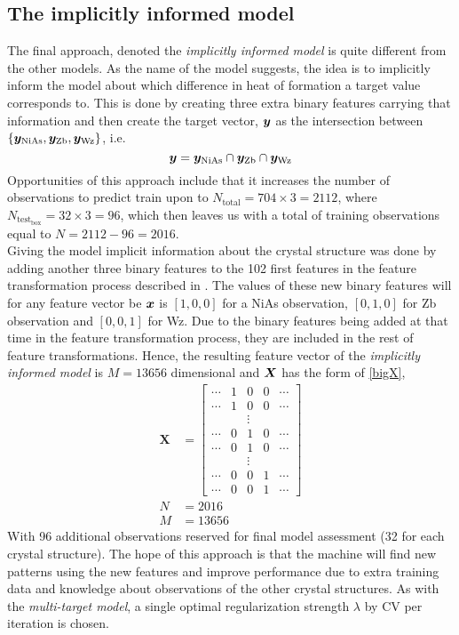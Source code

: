 \subsection{The implicitly informed model}
The final approach, denoted the \emph{implicitly informed model} is quite different from the other models. As the name of the model suggests, the idea is to implicitly inform the model about which difference in heat of formation a target value corresponds to. This is done by creating three extra binary features carrying that information and then create the target vector, $\bm{y}$ as the intersection between $\left\{\bm{y}_{\mathrm{NiAs}},\bm{y}_{\mathrm{Zb}},\bm{y}_{\mathrm{Wz}}\right\}$, i.e. 
\begin{equation}
    \bm{y} = \bm{y}_{\mathrm{NiAs}} \cap \bm{y}_{\mathrm{Zb}} \cap \bm{y}_{\mathrm{Wz}}
\end{equation}
Opportunities of this approach include that it increases the number of observations to predict train upon to $N_{\mathrm{total}} = 704 \times 3 = 2112$, where $N_{\mathrm{test}_\mathrm{box}} = 32 \times 3 = 96$, which then leaves us with a total of training observations equal to $N=2112-96=2016$. \\ 
Giving the model implicit information about the crystal structure was done by adding another three binary features to the 102 first features in the feature transformation process described in . The values of these new binary features will for any feature vector be $\bm{x}$ is $[1,0,0]$ for a NiAs observation, $[0,1,0]$ for Zb observation and $[0,0,1]$ for Wz. Due to the binary features being added at that time in the feature transformation process, they are included in the rest of feature transformations. Hence, the resulting feature vector of the \emph{implicitly informed model} is $M=13656$ dimensional and $\bm{X}$ has the form of \eqref{bigX},
\begin{align}
    \boldsymbol{X}&=
    \begin{bmatrix}
        \cdots & 1 &    0   & 0 & \cdots \\
        \cdots & 1 &    0   & 0 & \cdots \\
               &   & \vdots &   & \\
        \cdots & 0 &    1   & 0 & \cdots \\
        \cdots & 0 &    1   & 0 & \cdots \\
               &   & \vdots &   & \\
        \cdots & 0 &    0   & 1 & \cdots \\
        \cdots & 0 &    0   & 1 & \cdots
    \end{bmatrix}\\
    N&=2016\\
    M&=13656
    \label{eq:bigX}
\end{align}
With 96 additional observations reserved for final model assessment (32 for each crystal structure). The hope of this approach is that the machine will find new patterns using the new features and improve performance due to extra training data and knowledge about observations of the other crystal structures. As with the \emph{multi-target model}, a single optimal regularization strength $\lambda$ by CV per iteration is chosen.


